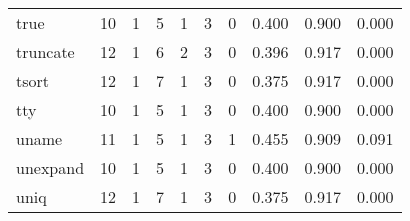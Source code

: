 \begin{longtable}{lp{1.3cm}p{1.3cm}p{1.3cm}p{1.3cm}p{1.3cm}p{1.3cm}p{1.3cm}p{1.3cm}p{1.3cm}}
true      &                     10 &                                             1 &                                            5 &                                           1 &                                            3 &                                          0 &                                0.400 &                                  0.900 &                                0.000 \\
truncate  &                     12 &                                             1 &                                            6 &                                           2 &                                            3 &                                          0 &                                0.396 &                                  0.917 &                                0.000 \\
tsort     &                     12 &                                             1 &                                            7 &                                           1 &                                            3 &                                          0 &                                0.375 &                                  0.917 &                                0.000 \\
tty       &                     10 &                                             1 &                                            5 &                                           1 &                                            3 &                                          0 &                                0.400 &                                  0.900 &                                0.000 \\
uname     &                     11 &                                             1 &                                            5 &                                           1 &                                            3 &                                          1 &                                0.455 &                                  0.909 &                                0.091 \\
unexpand  &                     10 &                                             1 &                                            5 &                                           1 &                                            3 &                                          0 &                                0.400 &                                  0.900 &                                0.000 \\
uniq      &                     12 &                                             1 &                                            7 &                                           1 &                                            3 &                                          0 &                                0.375 &                                  0.917 &                                0.000 \\

\end{longtable}
